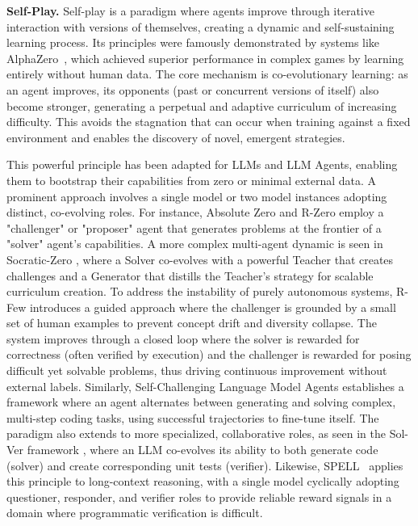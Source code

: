 \textbf{Self-Play.}
Self-play is a paradigm where agents improve through iterative interaction with versions of themselves, creating a dynamic and self-sustaining learning process. Its principles were famously demonstrated by systems like AlphaZero~\citep{silver2017mastering}, which achieved superior performance in complex games by learning entirely without human data. The core mechanism is co-evolutionary learning: as an agent improves, its opponents (past or concurrent versions of itself) also become stronger, generating a perpetual and adaptive curriculum of increasing difficulty. This avoids the stagnation that can occur when training against a fixed environment and enables the discovery of novel, emergent strategies.

This powerful principle has been adapted for LLMs and LLM Agents, enabling them to bootstrap their capabilities from zero or minimal external data. A prominent approach involves a single model or two model instances adopting distinct, co-evolving roles. For instance, Absolute Zero \citep{zhao2025absolute} and R-Zero \citep{huang2025r} employ a "challenger" or "proposer" agent that generates problems at the frontier of a "solver" agent's capabilities. A more complex multi-agent dynamic is seen in Socratic-Zero \citep{wang2025socratic}, where a Solver co-evolves with a powerful Teacher that creates challenges and a Generator that distills the Teacher's strategy for scalable curriculum creation. To address the instability of purely autonomous systems, R-Few \citep{yu2025guidedself} introduces a guided approach where the challenger is grounded by a small set of human examples to prevent concept drift and diversity collapse.
The system improves through a closed loop where the solver is rewarded for correctness (often verified by execution) and the challenger is rewarded for posing difficult yet solvable problems, thus driving continuous improvement without external labels. 
Similarly, Self-Challenging Language Model Agents \citep{zhou2025selfchallenginglanguagemodelagents} establishes a framework where an agent alternates between generating and solving complex, multi-step coding tasks, using successful trajectories to fine-tune itself. The paradigm also extends to more specialized, collaborative roles, as seen in the Sol-Ver framework \citep{lin2025learningtosolve}, where an LLM co-evolves its ability to both generate code (solver) and create corresponding unit tests (verifier). Likewise, SPELL~\citep{yang2025spell} applies this principle to long-context reasoning, with a single model cyclically adopting questioner, responder, and verifier roles to provide reliable reward signals in a domain where programmatic verification is difficult.


